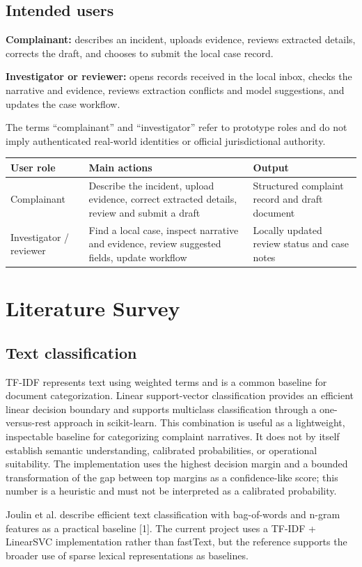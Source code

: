 \documentclass[12pt,a4paper,oneside]{report}
\begin{document}
\section{Intended users}
\textbf{Complainant:} describes an incident, uploads evidence, reviews extracted details, corrects the draft, and chooses to submit the local case record.\par\medskip
\textbf{Investigator or reviewer:} opens records received in the local inbox, checks the narrative and evidence, reviews extraction conflicts and model suggestions, and updates the case workflow.\par\medskip
The terms ``complainant'' and ``investigator'' refer to prototype roles and do not imply authenticated real-world identities or official jurisdictional authority.\par\medskip
{}
\begin{longtable}{|>{\RaggedRight\arraybackslash}p{}|>{\RaggedRight\arraybackslash}p{}|>{\RaggedRight\arraybackslash}p{}|}
\hline
\textbf{User role} & \textbf{Main actions} & \textbf{Output} \\\hline
Complainant & Describe the incident, upload evidence, correct extracted details, review and submit a draft & Structured complaint record and draft document \\\hline
Investigator / reviewer & Find a local case, inspect narrative and evidence, review suggested fields, update workflow & Locally updated review status and case notes \\\hline
\end{longtable}
\vspace{2mm}
\clearpage\chapter{Literature Survey}
\section{Text classification}
TF-IDF represents text using weighted terms and is a common baseline for document categorization. Linear support-vector classification provides an efficient linear decision boundary and supports multiclass classification through a one-versus-rest approach in scikit-learn. This combination is useful as a lightweight, inspectable baseline for categorizing complaint narratives. It does not by itself establish semantic understanding, calibrated probabilities, or operational suitability. The implementation uses the highest decision margin and a bounded transformation of the gap between top margins as a confidence-like score; this number is a heuristic and must not be interpreted as a calibrated probability.\par\medskip
Joulin et al. describe efficient text classification with bag-of-words and n-gram features as a practical baseline [1]. The current project uses a TF-IDF + LinearSVC implementation rather than fastText, but the reference supports the broader use of sparse lexical representations as baselines.\par\medskip
\end{document}
